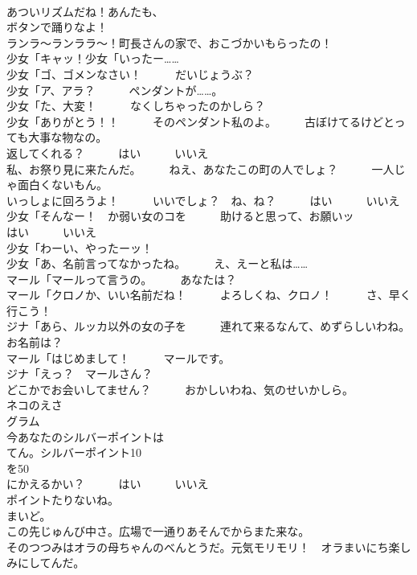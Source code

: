 \documentclass[8pt]{extreport}
\begin{document}
\begin{CJK}{UTF8}{min}
\\	あついリズムだね！あんたも、
\\	ボタンで踊りなよ！	
\\	ランラ～ランララ～！町長さんの家で、おこづかいもらったの！	
\\	少女「キャッ！少女「いったー……	
\\	少女「ゴ、ゴメンなさい！　　　だいじょうぶ？	
\\	少女「ア、アラ？　　　ペンダントが……。	
\\	少女「た、大変！　　　なくしちゃったのかしら？	
\\	少女「ありがとう！！　　　そのペンダント私のよ。　　　古ぼけてるけどとっても大事な物なの。	
\\	返してくれる？　　　はい　　　いいえ	
\\	私、お祭り見に来たんだ。　　　ねえ、あなたこの町の人でしょ？　　　一人じゃ面白くないもん。	
\\	いっしょに回ろうよ！　　　いいでしょ？　ね、ね？　　　はい　　　いいえ	
\\	少女「そんなー！　か弱い女のコを　　　助けると思って、お願いッ
\\	はい　　　いいえ	
\\	少女「わーい、やったーッ！	
\\	少女「あ、名前言ってなかったね。　　　え、えーと私は……	
\\	マール「マールって言うの。　　　あなたは？	
\\	マール「クロノか、いい名前だね！　　　よろしくね、クロノ！　　　さ、早く行こう！	
\\	ジナ「あら、ルッカ以外の女の子を　　　連れて来るなんて、めずらしいわね。　　　お名前は？	
\\	マール「はじめまして！　　　マールです。	
\\	ジナ「えっ？　マールさん？　　　
\\	どこかでお会いしてません？　　　おかしいわね、気のせいかしら。	
\\	ネコのえさ　
\\	グラム	
\\	今あなたのシルバーポイントは
\\	てん。シルバーポイント10
\\	を50
\\	にかえるかい？　　　はい　　　いいえ	
\\	ポイントたりないね。	
\\	まいど。	
\\	この先じゅんび中さ。広場で一通りあそんでからまた来な。	
\\	そのつつみはオラの母ちゃんのべんとうだ。元気モリモリ！　オラまいにち楽しみにしてんだ。	

\end{CJK}
\end{document}
